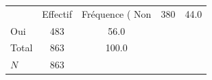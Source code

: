 {
\def\sym#1{\ifmmode^{#1}\else\(^{#1}\)\fi}
\begin{tabular}{l*{1}{cc}}
\toprule
            &    Effectif&Fréquence (%
\midrule
Non         &         380&        44.0\\
Oui         &         483&        56.0\\
Total       &         863&       100.0\\
\midrule
\(N\)       &         863&            \\
\bottomrule
\end{tabular}
}
